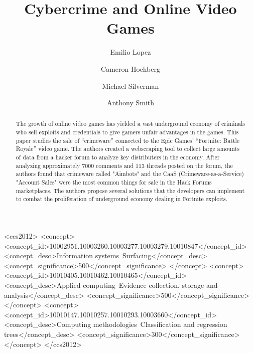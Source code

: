 \documentclass[sigconf]{acmart}
\begin{document}
\title{Cybercrime and Online Video Games}

\author{Emilio Lopez}

\author{Cameron Hochberg}

\author{Michael Silverman}

\author{Anthony Smith}

\renewcommand{\shortauthors}{Lopez, Hochberg, Silverman and Smith}

\begin{abstract}
  The growth of online video games has yielded a vast underground economy of
  criminals who sell exploits and credentials to give gamers unfair advantages
  in the games. This paper studies the sale of ``crimeware'' connected to
  the Epic Games' ``Fortnite: Battle Royale'' video game. The authors created 
  a webscraping tool to collect large amounts of data from a hacker forum to 
  analyze key distributers in the economy. After analyzing approximately 7000
  comments and 113 threads posted on the forum, the authors found that 
  crimeware called "Aimbots" and the CaaS (Crimeware-as-a-Service) "Account Sales"
  were the most common things for sale in the Hack Forums marketplaces. The 
  authors propose several solutions that the developers can implement to 
  combat the proliferation of underground economy dealing in Fortnite exploits.
\end{abstract}

\begin{CCSXML}
  <ccs2012>
  <concept>
  <concept_id>10002951.10003260.10003277.10003279.10010847</concept_id>
  <concept_desc>Information systems~Surfacing</concept_desc>
  <concept_significance>500</concept_significance>
  </concept>
  <concept>
  <concept_id>10010405.10010462.10010465</concept_id>
  <concept_desc>Applied computing~Evidence collection, storage and analysis</concept_desc>
  <concept_significance>500</concept_significance>
  </concept>
  <concept>
  <concept_id>10010147.10010257.10010293.10003660</concept_id>
  <concept_desc>Computing methodologies~Classification and regression trees</concept_desc>
  <concept_significance>300</concept_significance>
  </concept>
  </ccs2012>
\end{CCSXML}
  
\end{document}
